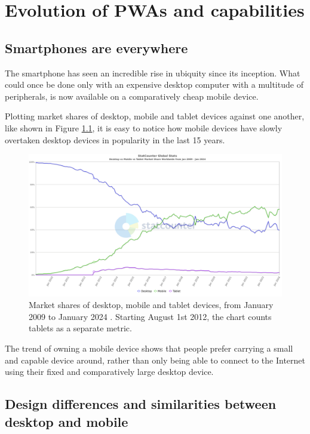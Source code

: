 \chapter{Evolution of PWAs and capabilities}

\section{Smartphones are everywhere}

The smartphone has seen an incredible rise in ubiquity since its inception. What could once be done only with an expensive desktop computer with a multitude of peripherals, is now available on a comparatively cheap mobile device.

Plotting market shares of desktop, mobile and tablet devices against one another, like shown in Figure \ref{FigStatCounterDMT}, it is easy to notice how mobile devices have slowly overtaken desktop devices in popularity in the last 15 years.

\begin{figure}[htbp]
    \centering
    \includegraphics[width=\textwidth]{./figures/ch2_desktop-vs-mobile.png}
    \caption{Market shares of desktop, mobile and tablet devices, from January 2009 to January 2024 \cite{StatCountDMT}. Starting August 1st 2012, the chart counts tablets as a separate metric.}
    \label{FigStatCounterDMT}
\end{figure}

The trend of owning a mobile device shows that people prefer carrying a small and capable device around, rather than only being able to connect to the Internet using their fixed and comparatively large desktop device.

\section{Design differences and similarities between desktop and mobile}

